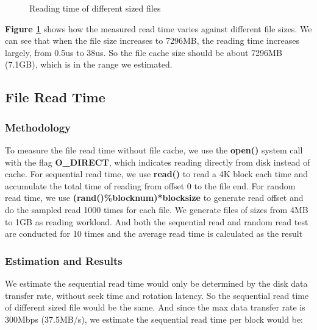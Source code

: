 \begin{figure}[ht]
    \centering
    \caption{Reading time of different sized files}
    \label{file_cache_size}
\end{figure}

\textbf{Figure \ref{file_cache_size}} shows how the measured read time varies against different file sizes. We can see that when the file size increases to 7296MB, the reading time increases largely, from 0.5us to 38us. So the file cache size should be about 7296MB (7.1GB), which is in the range we estimated.

\subsection{File Read Time}
\label {File_read_time_section}
\subsubsection{Methodology}
To measure the file read time without file cache, we use the \textbf{open()} system call with the flag \textbf{O_DIRECT}, which indicates reading directly from disk instead of cache. For sequential read time, we use \textbf{read()} to read a 4K block each time and accumulate the total time of reading from offset 0 to the file end. For random read time, we use \textbf{(rand()\%blocknum)*blocksize} to generate read offset and do the sampled read 1000 times for each file. We generate files of sizes from 4MB to 1GB as reading workload. And both the sequential read and random read test are conducted for 10 times and the average read time is calculated as the result

\subsubsection{Estimation and Results}
We estimate the sequential read time would only be determined by the disk data transfer rate, without seek time and rotation latency. So the sequential read time of different sized file would be the same. And since the max data transfer rate is 300Mbps (37.5MB/s), we estimate the sequential read time per block would be:

